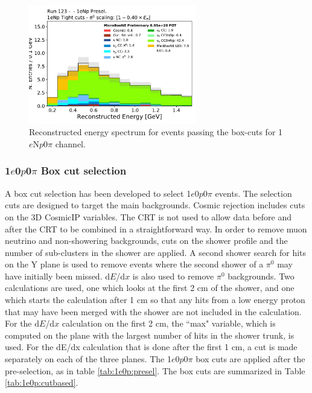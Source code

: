 \documentclass[a4paper]{article}
\newcommand{\npsel}{1$e$N$p$0$\pi$\xspace}
\newcommand{\zpsel}{1$e$0$p$0$\pi$\xspace}
\newcommand{\dedx}{d$E$/d$x$\xspace}
\begin{document}
\begin{figure}[ht]
\begin{center}
\includegraphics[width=0.65\textwidth]{1eNp/reco_e_tight.pdf}
\caption{\label{fig:1eNp:box:RUN1} Reconstructed energy spectrum for events passing the box-cuts for \npsel channel.}
\end{center}
\end{figure}




\subsubsection{\zpsel Box cut selection}
\label{app:nueslections:1e0p}
A box cut selection has been developed to select \zpsel events. The selection cuts are designed to target the main backgrounds.  
Cosmic rejection includes cuts 
on the 3D CosmicIP variables.  The CRT is not used to allow data before and after the CRT to be combined in a straightforward way.  In order to remove muon neutrino and non-showering backgrounds, cuts on the shower profile and the number of sub-clusters in the shower are applied.  A second shower search for hits on the Y plane is used to remove events where the second shower of a $\pi^{0}$ may have initially been missed.  \dedx is also used to remove $\pi^{0}$ backgrounds.  Two calculations are used, one which looks at the first 2 cm of the shower, and one which starts the calculation after 1 cm so that any hits from a low energy proton that may have been merged with the shower are not included in the calculation.  
For the \dedx calculation on the first 2 cm, the ``max" variable, which is computed on the plane with the largest number of hits in the shower trunk, is used. For the dE/dx calculation that is done after the first 1 cm, a cut is made separately on each of the three planes.
The \zpsel box cuts are applied after the pre-selection, as in table \ref{tab:1e0p:presel}.  The box cuts are summarized in Table \ref{tab:1e0p:cutbased}.
\end{document}
